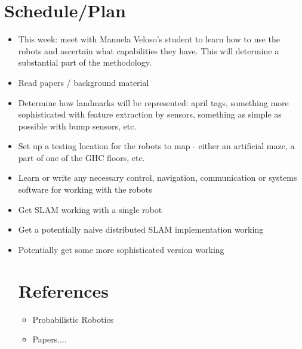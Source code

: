\documentclass[11pt]{article}
\begin{document}
\section{Schedule/Plan}

\begin{itemize}
    \item This week: meet with Manuela Veloso's student to learn how to use the robots and ascertain what capabilities they have.  This will determine a substantial part of the methodology.
    \item Read papers / background material
    \item Determine how landmarks will be represented: april tags, something more sophisticated with feature extraction by sensors, something as simple as possible with bump sensors, etc.
    \item Set up a testing location for the robots to map - either an artificial maze, a part of one of the GHC floors, etc.
    \item Learn or write any necessary control, navigation, communication or systems software for working with the robots
    \item Get SLAM working with a single robot
    \item Get a potentially naive distributed SLAM implementation working
    \item Potentially get some more sophisticated version working

        \section{References}
\begin{itemize}
    \item Probabilistic Robotics
    \item Papers....

\end{itemize}

\end{itemize}
\end{document}
